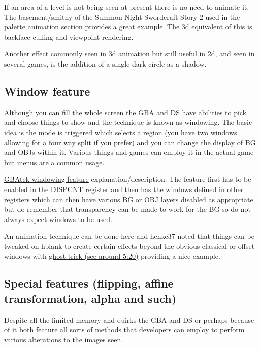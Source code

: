 \documentclass[
]{book}
\begin{document}
If an area of a level is not being seen at present there is no need to animate it. The basement/smithy of the Summon Night Swordcraft Story 2 used in the palette animation section provides a great example. The 3d equivalent of this is backface culling and viewpoint rendering.

Another effect commonly seen in 3d animation but still useful in 2d, and seen in several games, is the addition of a single dark circle as a shadow.

\hypertarget{window-feature}{%
\subsection{Window feature}\label{window-feature}}

Although you can fill the whole screen the GBA and DS have abilities to pick and choose things to show and the technique is known as windowing. The basic idea is the mode is triggered which selects a region (you have two windows allowing for a four way split if you prefer) and you can change the display of BG and OBJs within it. Various things and games can employ it in the actual game but menus are a common usage.

\href{http://problemkaputt.de/gbatek.htm\#lcdiowindowfeature}{GBAtek windowing feature} explanation/description. The feature first has to be enabled in the DISPCNT register and then has the windows defined in other registers which can then have various BG or OBJ layers disabled as appropriate but do remember that transparency can be made to work for the BG so do not always expect windows to be used.

An animation technique can be done here and henke37 noted that things can be tweaked on hblank to create certain effects beyond the obvious classical or offset windows with \href{http://www.youtube.com/watch?v=1t8wWnI_I1I\&feature=related}{ghost trick (see around 5:20)} providing a nice example.

\hypertarget{special-features-flipping-affine-transformation-alpha-and-such}{%
\subsection{Special features (flipping, affine transformation, alpha and such)}\label{special-features-flipping-affine-transformation-alpha-and-such}}

Despite all the limited memory and quirks the GBA and DS or perhaps because of it both feature all sorts of methods that developers can employ to perform various alterations to the images seen.
\end{document}
